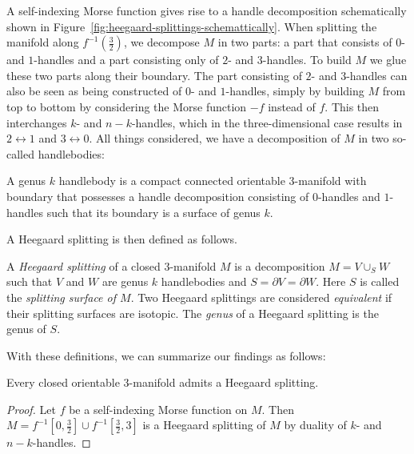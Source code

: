 A self-indexing Morse function gives rise to a handle decomposition schematically shown in Figure~\ref{fig:heegaard-splittings-schemattically}. When splitting the manifold along $f^{-1}(\frac{3}{2})$, we decompose $M$ in two parts: a part that consists of $0$- and $1$-handles and a part consisting only of $2$- and  $3$-handles.
To build $M$ we glue these two parts along their boundary.
The part consisting of $2$- and $3$-handles can also be seen as being constructed of $0$- and $1$-handles, simply by building $M$ from top to bottom by considering the Morse function $-f$ instead of $f$. This then interchanges $k$- and $n-k$-handles, which in the three-dimensional case results in $2 \leftrightarrow 1$ and  $3 \leftrightarrow 0$.
All things considered, we have a decomposition of $M$ in two so-called handlebodies:
\begin{definition}
    A genus $k$ handlebody is a compact connected orientable $3$-manifold with boundary that possesses a handle decomposition consisting of $0$-handles and $1$-handles such that its boundary is a surface of genus $k$.
\end{definition}
A Heegaard splitting is then defined as follows.
\begin{definition}
    A \emph{Heegaard splitting} of a closed $3$-manifold $M$ is a decomposition $M = V \cup _S W$ such that $V$ and $W$ are genus $k$ handlebodies and  $S = \partial V = \partial W$. Here  $S$ is called the \emph{splitting surface of $M$}.
    Two Heegaard splittings are considered \emph{equivalent} if their splitting surfaces are isotopic. The \emph{genus} of a Heegaard splitting is the genus of $S$.
\end{definition}

With these definitions, we can summarize our findings as follows:
\begin{theorem}
    Every closed orientable $3$-manifold admits a Heegaard splitting.
\end{theorem}
\begin{proof}
    Let $f$ be a self-indexing Morse function on $M$.
    Then $M = f^{-1}\left[0, \tfrac{3}{2}\right] \cup f^{-1}\left[\tfrac{3}{2}, 3\right]$ is a Heegaard splitting of $M$ by duality of $k$- and $n-k$-handles.
\end{proof}

